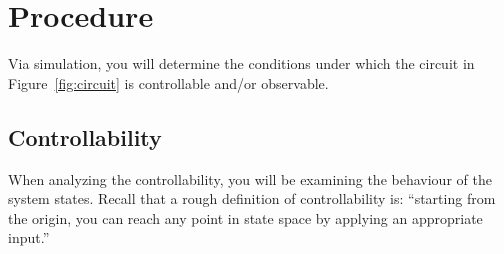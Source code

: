 \section{Procedure}

Via simulation, you will determine the conditions under which the circuit in
Figure~\ref{fig:circuit} is controllable and/or observable.

\subsection{Controllability}

When analyzing the controllability, you will be examining the behaviour of
the system states.  Recall that a rough definition of controllability is:
``starting from the origin, you can reach any point in state space by
applying an appropriate input.''
